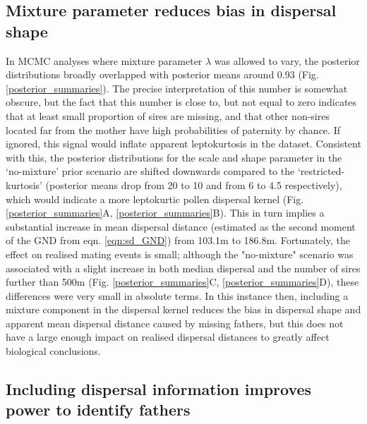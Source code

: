 \documentclass[10pt, a4paper, twocolumn]{article} %
\begin{document}
\subsection{Mixture parameter reduces bias in dispersal shape}

In MCMC analyses where mixture parameter $\lambda$ was allowed to vary, the posterior distributions broadly overlapped with posterior means around 0.93 (Fig. \ref{posterior_summaries}).
The precise interpretation of this number is somewhat obscure, but the fact that this number is close to, but not equal to zero indicates that at least small proportion of sires are missing, and that other non-sires located far from the mother have high probabilities of paternity by chance.
If ignored, this signal would inflate apparent leptokurtosis in the dataset.
Consistent with this, the posterior distributions for the scale and shape parameter in the ‘no-mixture’ prior scenario are shifted downwards compared to the ‘restricted-kurtosis’ (posterior means drop from 20 to 10 and from 6 to 4.5 respectively), which would indicate a more leptokurtic pollen dispersal kernel (Fig. \ref{posterior_summaries}A, \ref{posterior_summaries}B).
This in turn implies a substantial increase in mean dispersal distance (estimated as the second moment of the GND from eqn. \ref{eqn:sd_GND}) from 103.1m to 186.8m.
Fortunately, the effect on realised mating events is small; although the "no-mixture" scenario was associated with a slight increase in both median dispersal and the number of sires further than 500m (Fig. \ref{posterior_summaries}C, \ref{posterior_summaries}D), these differences were very small in absolute terms.
In this instance then, including a mixture component in the dispersal kernel reduces the bias in dispersal shape and apparent mean dispersal distance caused by missing fathers, but this does not have a large enough impact on realised dispersal distances to greatly affect biological conclusions.

\subsection{Including dispersal information improves power to identify fathers}
\end{document}
